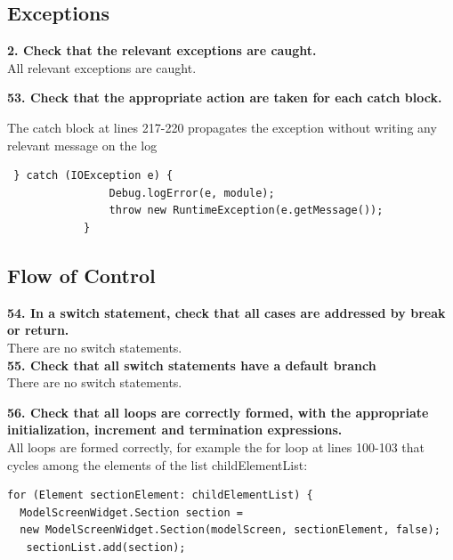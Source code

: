 \documentclass{article}
\begin{document}
\begin{flushleft}
\subsection{Exceptions}

\textbf{2. Check that the relevant exceptions are caught.}\\
\vspace{0.5cm}
All relevant exceptions are caught. \\
\vspace{0.5cm}

\textbf{53. Check that the appropriate action are taken for each catch block.}\\
\vspace{0.5cm}

The catch block at lines 217-220 propagates the exception without writing any relevant message on the log\\
\vspace{0.5cm}
\begin{lstlisting}
 } catch (IOException e) {
                Debug.logError(e, module);
                throw new RuntimeException(e.getMessage());
            }
\end{lstlisting}
\vspace{0.5cm}




\subsection{Flow of Control}
\textbf{54. In a switch statement, check that all cases are addressed by break or return.}\\
\vspace{0.5cm}
There are no switch statements.\\
\vspace{0.5cm}
\textbf{55. Check that all switch statements have a default branch}\\
\vspace{0.5cm}
There are no switch statements.\\
\vspace{0.5cm}

\textbf{56. Check that all loops are correctly formed, with the appropriate initialization, increment and termination expressions.}\\
\vspace{0.5cm}
All loops are formed correctly, for example the for loop at lines 100-103 that cycles among the elements of the list childElementList:\\
\vspace{0.5cm}
 \begin{lstlisting}         
for (Element sectionElement: childElementList) {
  ModelScreenWidget.Section section = 
  new ModelScreenWidget.Section(modelScreen, sectionElement, false);
   sectionList.add(section);
            

\end{lstlisting}
\end{flushleft}
\end{document}
